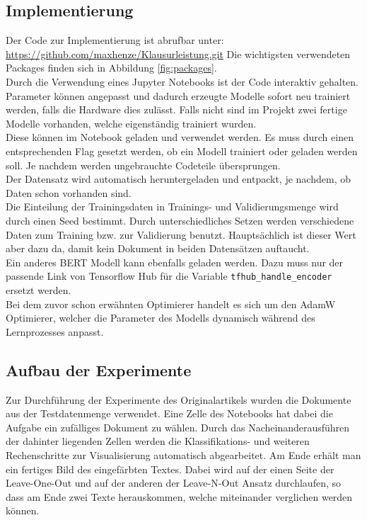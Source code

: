 \documentclass[DIV=13,fontsize=11pt]{scrartcl}
\begin{document}
\subsection{Implementierung}

Der Code zur Implementierung ist abrufbar unter: \url{https://github.com/maxhenze/Klausurleistung.git}
Die wichtigsten verwendeten Packages finden sich in Abbildung \ref{fig:packages}.\\

Durch die Verwendung eines Jupyter Notebooks ist der Code interaktiv gehalten.
Parameter können angepasst und dadurch erzeugte Modelle sofort
neu trainiert werden, falls die Hardware dies zulässt. Falls nicht
sind im Projekt zwei fertige Modelle vorhanden, welche eigenständig trainiert wurden.\\

Diese können im Notebook geladen und verwendet werden. Es muss durch einen
entsprechenden Flag gesetzt werden, ob ein Modell trainiert oder geladen werden soll.
Je nachdem werden ungebrauchte Codeteile übersprungen.\\

Der Datensatz wird automatisch heruntergeladen und entpackt, je nachdem, ob
Daten schon vorhanden sind.\\

Die Einteilung der Trainingsdaten in Trainings- und Validierungsmenge wird durch
einen Seed bestimmt. Durch unterschiedliches Setzen werden verschiedene
Daten zum Training bzw. zur Validierung benutzt. Hauptsächlich ist dieser
Wert aber dazu da, damit kein Dokument in beiden Datensätzen auftaucht.\\

Ein anderes BERT Modell kann ebenfalls geladen werden. Dazu muss nur der passende
Link von Tensorflow Hub für die Variable \texttt{tfhub\_handle\_encoder} ersetzt
werden.\\

Bei dem zuvor schon erwähnten Optimierer handelt es sich um den AdamW~\cite{DBLP:journals/corr/abs-1711-05101}
Optimierer, welcher die Parameter des Modells dynamisch während des Lernprozesses
anpasst.\\

\subsection{Aufbau der Experimente}

Zur Durchführung der Experimente des Originalartikels wurden die Dokumente
aus der Testdatenmenge verwendet. Eine Zelle des Notebooks hat dabei die Aufgabe ein zufälliges
Dokument zu wählen. Durch das Nacheinanderausführen der dahinter liegenden
Zellen werden die Klassifikations- und weiteren Rechenschritte zur Visualisierung
automatisch abgearbeitet. Am Ende erhält man ein fertiges Bild des
eingefärbten Textes. Dabei wird auf der einen Seite der Leave-One-Out und auf der
anderen der Leave-N-Out Ansatz durchlaufen, so dass am Ende zwei Texte herauskommen,
welche miteinander verglichen werden können.
\end{document}

